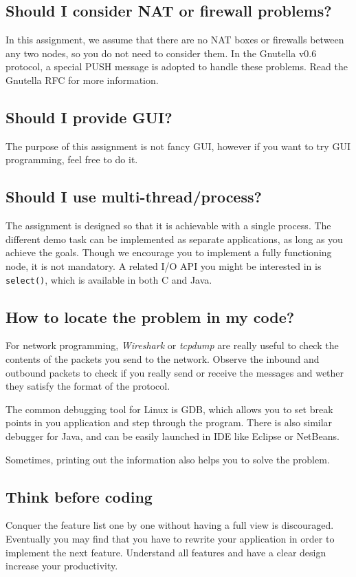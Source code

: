 \documentclass[12pt, a4paper]{article}
\begin{document}
\subsection*{Should I consider NAT or firewall problems?}
In this assignment, we assume that there are no NAT boxes or firewalls between any two nodes, so you do not need to consider them.
In the Gnutella v0.6 protocol, a special PUSH message is adopted to handle these problems.
Read the Gnutella RFC for more information.

\subsection*{Should I provide GUI?}
The purpose of this assignment is not fancy GUI, however if you want to try GUI programming, feel free to do it.

\subsection*{Should I use multi-thread/process?}
The assignment is designed so that it is achievable with a single process.
The different demo task can be implemented as separate applications, as long as you achieve the goals.
Though we encourage you to implement a fully functioning node, it is not mandatory.
A related I/O API you might be interested in is \texttt{select()}, which is available in both C and Java.

\subsection*{How to locate the problem in my code?}
For network programming, \emph{Wireshark} or \emph{tcpdump} are really useful to check the contents of the packets you send to the network.
Observe the inbound and outbound packets to check if you really send or receive the messages and wether they satisfy the format of the protocol.

The common debugging tool for Linux is GDB, which allows you to set break points in you application and step through the program.
There is also similar debugger for Java, and can be easily launched in IDE like Eclipse or NetBeans.

Sometimes, printing out the information also helps you to solve the problem.

\subsection*{Think before coding}
Conquer the feature list one by one without having a full view is discouraged.
Eventually you may find that you have to rewrite your application in order to implement the next feature.
Understand all features and have a clear design increase your productivity.
\end{document}

